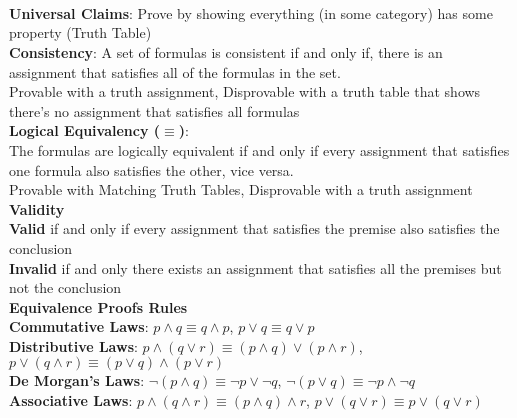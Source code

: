 \documentclass{article}
\begin{document}
	 \\
	 \\
	 \\
	\indent{}\textbf{Universal Claims}: Prove by showing everything (in some category) has some property (Truth Table) \\
	\indent{}\textbf{Consistency}: A set of formulas is consistent if and only if, there is an assignment that satisfies all of the formulas in the set. \\
		\indent{\hspace{\parindent}}Provable with a truth assignment, Disprovable with a truth table that shows there's no assignment that satisfies all formulas \\
	\indent{}\textbf{Logical Equivalency ($\equiv$)}: \\
		\indent{\hspace{\parindent}}The formulas are logically equivalent if and only if every assignment that satisfies one formula also satisfies the other, vice versa. \\
		\indent{\hspace{\parindent}}Provable with Matching Truth Tables, Disprovable with a truth assignment \\
	\indent{}\textbf{Validity} \\
		\indent{\hspace{\parindent}}\textbf{Valid} if and only if every assignment that satisfies the premise also satisfies the conclusion \\
		\indent{\hspace{\parindent}}\textbf{Invalid} if and only there exists an assignment that satisfies all the premises but not the conclusion \\
\textbf{Equivalence Proofs Rules} \\
	\indent{}\textbf{Commutative Laws}: $p \land q \equiv q \land p$, $p \lor q \equiv q \lor p$ \\
	\indent{}\textbf{Distributive Laws}: $p \land (q \lor r) \equiv (p \land q) \lor (p \land r)$, $p \lor (q \land r) \equiv (p \lor q) \land (p \lor r)$ \\
	\indent{}\textbf{De Morgan's Laws}: $\neg (p \land q) \equiv \neg p \lor \neg q$, $\neg (p \lor q) \equiv \neg p \land \neg q$ \\
	\indent{}\textbf{Associative Laws}: $p \land (q \land r) \equiv (p \land q) \land r$, $p \lor (q \lor r) \equiv p \lor (q \lor r)$ \\
\end{document}
